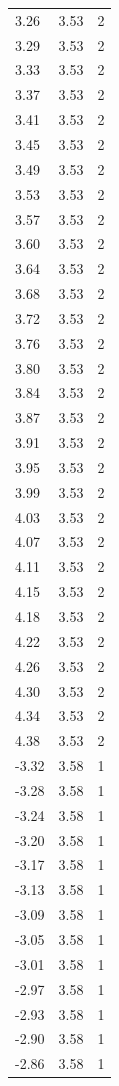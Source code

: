 \begin{longtable}{lrr}
  3.26 & 3.53 & 2 \\
  3.29 & 3.53 & 2 \\
  3.33 & 3.53 & 2 \\
  3.37 & 3.53 & 2 \\
  3.41 & 3.53 & 2 \\
  3.45 & 3.53 & 2 \\
  3.49 & 3.53 & 2 \\
  3.53 & 3.53 & 2 \\
  3.57 & 3.53 & 2 \\
  3.60 & 3.53 & 2 \\
  3.64 & 3.53 & 2 \\
  3.68 & 3.53 & 2 \\
  3.72 & 3.53 & 2 \\
  3.76 & 3.53 & 2 \\
  3.80 & 3.53 & 2 \\
  3.84 & 3.53 & 2 \\
  3.87 & 3.53 & 2 \\
  3.91 & 3.53 & 2 \\
  3.95 & 3.53 & 2 \\
  3.99 & 3.53 & 2 \\
  4.03 & 3.53 & 2 \\
  4.07 & 3.53 & 2 \\
  4.11 & 3.53 & 2 \\
  4.15 & 3.53 & 2 \\
  4.18 & 3.53 & 2 \\
  4.22 & 3.53 & 2 \\
  4.26 & 3.53 & 2 \\
  4.30 & 3.53 & 2 \\
  4.34 & 3.53 & 2 \\
  4.38 & 3.53 & 2 \\
  -3.32 & 3.58 & 1 \\
  -3.28 & 3.58 & 1 \\
  -3.24 & 3.58 & 1 \\
  -3.20 & 3.58 & 1 \\
  -3.17 & 3.58 & 1 \\
  -3.13 & 3.58 & 1 \\
  -3.09 & 3.58 & 1 \\
  -3.05 & 3.58 & 1 \\
  -3.01 & 3.58 & 1 \\
  -2.97 & 3.58 & 1 \\
  -2.93 & 3.58 & 1 \\
  -2.90 & 3.58 & 1 \\
  -2.86 & 3.58 & 1 \\

\end{longtable}
